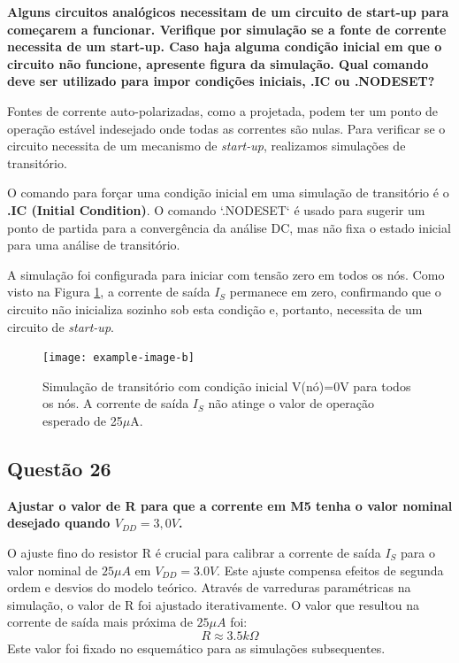 ﻿\documentclass[12pt,a4paper]{article}
\begin{document}
\textbf{Alguns circuitos analógicos necessitam de um circuito de start-up para começarem a funcionar. Verifique por simulação se a fonte de corrente necessita de um start-up. Caso haja alguma condição inicial em que o circuito não funcione, apresente figura da simulação. Qual comando deve ser utilizado para impor condições iniciais, .IC ou .NODESET?}

Fontes de corrente auto-polarizadas, como a projetada, podem ter um ponto de operação estável indesejado onde todas as correntes são nulas. Para verificar se o circuito necessita de um mecanismo de \textit{start-up}, realizamos simulações de transitório.

O comando para forçar uma condição inicial em uma simulação de transitório é o \textbf{.IC (Initial Condition)}. O comando `.NODESET` é usado para sugerir um ponto de partida para a convergência da análise DC, mas não fixa o estado inicial para uma análise de transitório.

A simulação foi configurada para iniciar com tensão zero em todos os nós. Como visto na Figura \ref{fig:startup_fail}, a corrente de saída $I_S$ permanece em zero, confirmando que o circuito não inicializa sozinho sob esta condição e, portanto, necessita de um circuito de \textit{start-up}.

\begin{figure}[H]
\centering
\texttt{[image: example-image-b]}
\caption{Simulação de transitório com condição inicial V(nó)=0V para todos os nós. A corrente de saída $I_S$ não atinge o valor de operação esperado de 25$\mu$A.}
\label{fig:startup_fail}
\end{figure}


\subsection*{Questão 26}

\textbf{Ajustar o valor de R para que a corrente em M5 tenha o valor nominal desejado quando $V_{DD} = 3,0V$.}

O ajuste fino do resistor R é crucial para calibrar a corrente de saída $I_S$ para o valor nominal de $25\mu A$ em $V_{DD} = 3.0V$. Este ajuste compensa efeitos de segunda ordem e desvios do modelo teórico. Através de varreduras paramétricas na simulação, o valor de R foi ajustado iterativamente. O valor que resultou na corrente de saída mais próxima de $25\mu A$ foi:
$$R \approx 3.5k\Omega$$
Este valor foi fixado no esquemático para as simulações subsequentes.
\end{document}
